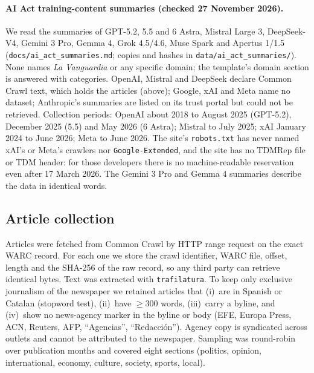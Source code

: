 \documentclass[10pt,a4paper]{article}
\begin{document}
\paragraph{AI Act training-content summaries (checked 27 November 2026).} We read the summaries of GPT-5.2, 5.5 and 6
Astra, Mistral Large 3, DeepSeek-V4, Gemini 3 Pro, Gemma 4, Grok 4.5/4.6, Muse Spark and Apertus 1/1.5
(\texttt{docs/ai\_act\_summaries.md}; copies and hashes in \texttt{data/ai\_act\_summaries/}). None names \emph{La
Vanguardia} or any specific domain; the template's domain section is answered with categories. OpenAI, Mistral and
DeepSeek declare Common Crawl text, which holds the articles (above); Google, xAI and Meta name no dataset; Anthropic's
summaries are listed on its trust portal but could not be retrieved. Collection periods: OpenAI about 2018 to August
2025 (GPT-5.2), December 2025 (5.5) and May 2026 (6 Astra); Mistral to July 2025; xAI January 2024 to June 2026; Meta
to June 2026. The site's \texttt{robots.txt} has never named xAI's or Meta's crawlers nor \texttt{Google-Extended},
and the site has no TDMRep file or TDM header: for those developers there is no machine-readable reservation even
after 17 March 2026. The Gemini 3 Pro and Gemma 4 summaries describe the data in identical words.

\subsection{Article collection}
Articles were fetched from Common Crawl by HTTP range request on the exact WARC record. For each one we store the
crawl identifier, WARC file, offset, length and the SHA-256 of the raw record, so any third party can retrieve
identical bytes. Text was extracted with \texttt{trafilatura}. To keep only exclusive journalism of the newspaper we
retained articles that (i)~are in Spanish or Catalan (stopword test), (ii)~have $\ge300$ words, (iii)~carry a byline,
and (iv)~show no news-agency marker in the byline or body (EFE, Europa Press, ACN, Reuters, AFP, ``Agencias'',
``Redacci\'on''). Agency copy is syndicated across outlets and cannot be attributed to the newspaper. Sampling was
round-robin over publication months and covered eight sections (politics, opinion, international, economy, culture,
society, sports, local).
\end{document}
